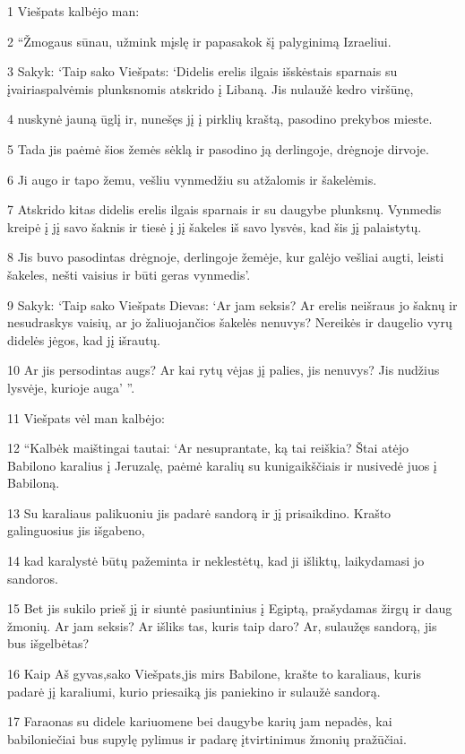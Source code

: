 \par 1 Viešpats kalbėjo man: 
\par 2 “Žmogaus sūnau, užmink mįslę ir papasakok šį palyginimą Izraeliui. 
\par 3 Sakyk: ‘Taip sako Viešpats: ‘Didelis erelis ilgais išskėstais sparnais su įvairiaspalvėmis plunksnomis atskrido į Libaną. Jis nulaužė kedro viršūnę, 
\par 4 nuskynė jauną ūglį ir, nunešęs jį į pirklių kraštą, pasodino prekybos mieste. 
\par 5 Tada jis paėmė šios žemės sėklą ir pasodino ją derlingoje, drėgnoje dirvoje. 
\par 6 Ji augo ir tapo žemu, vešliu vynmedžiu su atžalomis ir šakelėmis. 
\par 7 Atskrido kitas didelis erelis ilgais sparnais ir su daugybe plunksnų. Vynmedis kreipė į jį savo šaknis ir tiesė į jį šakeles iš savo lysvės, kad šis jį palaistytų. 
\par 8 Jis buvo pasodintas drėgnoje, derlingoje žemėje, kur galėjo vešliai augti, leisti šakeles, nešti vaisius ir būti geras vynmedis’. 
\par 9 Sakyk: ‘Taip sako Viešpats Dievas: ‘Ar jam seksis? Ar erelis neišraus jo šaknų ir nesudraskys vaisių, ar jo žaliuojančios šakelės nenuvys? Nereikės ir daugelio vyrų didelės jėgos, kad jį išrautų. 
\par 10 Ar jis persodintas augs? Ar kai rytų vėjas jį palies, jis nenuvys? Jis nudžius lysvėje, kurioje auga’ ”. 
\par 11 Viešpats vėl man kalbėjo: 
\par 12 “Kalbėk maištingai tautai: ‘Ar nesuprantate, ką tai reiškia? Štai atėjo Babilono karalius į Jeruzalę, paėmė karalių su kunigaikščiais ir nusivedė juos į Babiloną. 
\par 13 Su karaliaus palikuoniu jis padarė sandorą ir jį prisaikdino. Krašto galinguosius jis išgabeno, 
\par 14 kad karalystė būtų pažeminta ir neklestėtų, kad ji išliktų, laikydamasi jo sandoros. 
\par 15 Bet jis sukilo prieš jį ir siuntė pasiuntinius į Egiptą, prašydamas žirgų ir daug žmonių. Ar jam seksis? Ar išliks tas, kuris taip daro? Ar, sulaužęs sandorą, jis bus išgelbėtas? 
\par 16 Kaip Aš gyvas,­sako Viešpats,­jis mirs Babilone, krašte to karaliaus, kuris padarė jį karaliumi, kurio priesaiką jis paniekino ir sulaužė sandorą. 
\par 17 Faraonas su didele kariuomene bei daugybe karių jam nepadės, kai babiloniečiai bus supylę pylimus ir padarę įtvirtinimus žmonių pražūčiai. 
